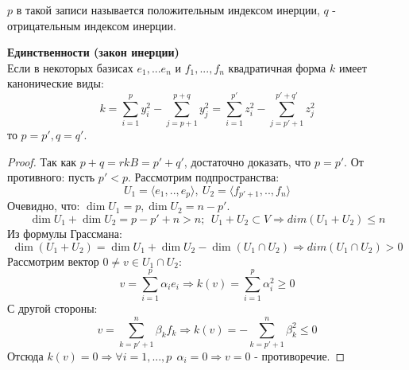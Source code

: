 \begin{definition}
    $p$ в такой записи называется положительным индексом инерции, $q$ - отрицательным индексом инерции.
\end{definition} 
\begin{theorem} \textbf{ Единственности (закон инерции)} \\
    Если в некоторых базисах $e_1,...e_n$ и $f_1,...,f_n$ квадратичная форма $k$ имеет канонические виды:
    $$k = \sum \limits_{i=1}^p y_i^2 - \sum \limits_{j=p+1}^{p+q} y_j^2 = \sum \limits_{i=1}^{p'} z_i^2 - \sum \limits_{j=p'+1}^{p'+q'} z_j^2$$
    то $p = p', q = q'$.
\end{theorem} 
\begin{proof}
    Так как $p + q = rk B = p' + q'$, достаточно доказать, что $p = p'$.
    От противного: пусть $p' < p$. Рассмотрим подпространства: 
    $$U_1 = \langle e_1,..,e_p \rangle, \ U_2 = \langle f_{p'+1},..,f_n \rangle$$ 
    Очевидно, что: $\dim U_1 = p, \dim U_2 = n- p'$.
    $$\dim U_1 + \dim U_2 = p - p' + n > n; \ \ U_1 + U_2 \subset V \Rightarrow dim(U_1 + U_2) \leq n$$
    Из формулы Грассмана:
    $$\dim (U_1 + U_2) = \dim U_1 + \dim U_2 - \dim (U_1 \cap U_2) \Rightarrow dim(U_1 \cap U_2) > 0$$
    Рассмотрим вектор $0 \neq v \in U_1 \cap U_2$:
    $$v = \sum \limits_{i=1}^{p} \alpha_i e_i \Rightarrow k(v) = \sum \limits_{i=1}^{p} \alpha_i^2 \geq 0$$
    С другой стороны:
    $$v = \sum \limits_{k=p'+1}^{n} \beta_k f_k \Rightarrow k(v) = -\sum \limits_{k=p'+1}^{n} \beta_k^2 \leq 0$$
    Отсюда $k(v) = 0 \Longrightarrow \forall i = 1,...,p \ \ \alpha_i = 0 \Longrightarrow v = 0$ - противоречие.
\end{proof}
